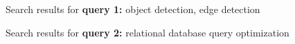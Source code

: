 \documentclass[twoside]{article}
\begin{document}
\begin{figure}
    \centering
    \qquad
    \caption{Search results for \textbf{query 1:} object detection, edge detection} %
    \label{fig:comp1}%
\end{figure}

\begin{figure}
    \centering
    \qquad
    \caption{Search results for \textbf{query 2:} relational database query optimization} %
    \label{fig:comp1}%
\end{figure}
\end{document}

